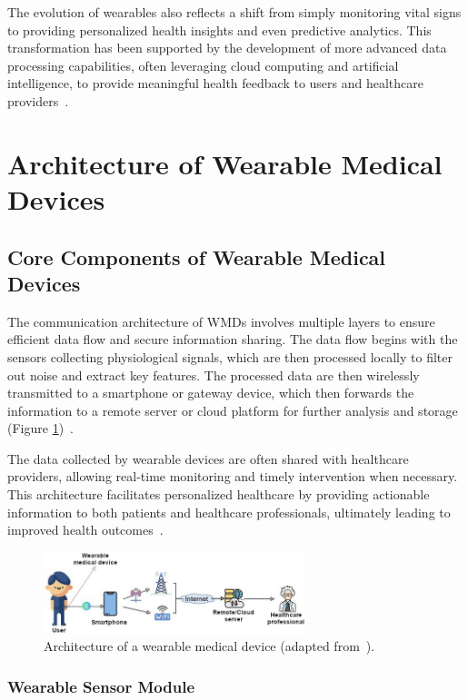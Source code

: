 \documentclass[journal]{IEEEtran}
\begin{document}
    The evolution of wearables also reflects a shift from simply monitoring vital signs to providing personalized health insights and even predictive analytics. This transformation has been supported by the development of more advanced data processing capabilities, often leveraging cloud computing and artificial intelligence, to provide meaningful health feedback to users and healthcare providers~\cite{Ates2022}.

\section{Architecture of Wearable Medical Devices}
\label{4.Architecture}
    \subsection{Core Components of Wearable Medical Devices}

    The communication architecture of WMDs involves multiple layers to ensure efficient data flow and secure information sharing. The data flow begins with the sensors collecting physiological signals, which are then processed locally to filter out noise and extract key features. The processed data are then wirelessly transmitted to a smartphone or gateway device, which then forwards the information to a remote server or cloud platform for further analysis and storage (Figure \ref{fig:architecture})~\cite{Saifuzzaman2021,Ates2022}.

    The data collected by wearable devices are often shared with healthcare providers, allowing real-time monitoring and timely intervention when necessary. This architecture facilitates personalized healthcare by providing actionable information to both patients and healthcare professionals, ultimately leading to improved health outcomes~\cite{Guk2019}.

    \begin{figure}[ht]
    \centering
    \includegraphics[width=3in]{Figuras/architecture.jpeg}
    \caption{Architecture of a wearable medical device (adapted from~\cite{Saifuzzaman2021}).}
    \label{fig:architecture}
    \end{figure}
    
        \subsubsection{Wearable Sensor Module}
        
\end{document}
